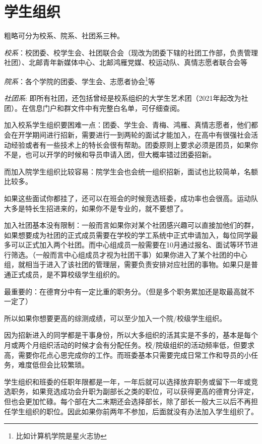 \section{学生组织}


粗略可分为校系、院系、社团系三种。

\emph{校系}：校团委、校学生会、社团联合会（现改为团委下辖的社团工作部，负责管理社团）、北邮青年新媒体中心、北邮鸿雁党媒、校运动队、真情志愿者联合会等

\emph{院系}：各个学院的团委、学生会、志愿者协会\footnote{比如计算机学院是星火志协}等

\emph{社团系}: 即所有社团，还包括曾经是校系组织的大学生艺术团（2021年起改为社团）。在信息门户和群文件中有完整白名单，可仔细查阅。

加入校系学生组织要困难一点：团委、学生会、青梅、鸿雁、真情志愿者，他们都会在开学期间进行招新，需要进行一到两轮的面试才能加入，在高中有很强社会活动经验或者有一些技术上的特长会很有帮助。团委原则上要求必须是团员，如果你不是，也可以开学的时候和导员申请入团，但大概率错过团委招新。

而加入院学生组织比较容易：院学生会也会统一组织招新，面试也比较简单，名额比较多。

如果这些面试你都挂了，还可以在班会的时候竞选班委，成功率也会很高。运动队大多是特长生招进来的，如果你不是专业的，就不要想了。

加入社团基本没有限制：一般而言如果你对某个社团感兴趣可以直接加他们的群，如果想要成为社团的正式成员需要在学校的学工系统中正式申请加入，每位同学最多可以正式加入两个社团。而中心组成员一般需要在10月通过报名、面试等环节进行筛选。（一般而言中心组成员才视为社团干事）如果你进入了某个社团的中心组，就相当于进入了该社团的管理层，需要负责安排对应社团的事物。如果只是普通正式成员，是不算校级学生组织的。


最重要的：在德育分中有一定比重的职务分。（但是多个职务累加还是取最高就不一定了）

所以如果你想要更高的综测成绩，可以至少加入一个院/校级学生组织。

因为招新进入的同学都是干事身份，所以大多组织的活其实是不多的，基本是每个月或两个月组织活动的时候才会有分配任务。校/院级组织的活动频率低，但要求高，需要你花点心思完成你的工作。而班委基本只需要完成日常工作和导员的小任务，难度低但会比较繁琐。

学生组织和班委的任职年限都是一年，一年后就可以选择放弃职务或留下一年或竞选职务，如果竞选成功会升职为副部长之类的职位，可以获得更高的德育分评定，但也会更加忙碌。每个部在大二末期还会选择部长，除了部长一般大三以后不再担任学生组织的职位。因此如果你前两年不参加，后面就没有办法加入学生组织了。

